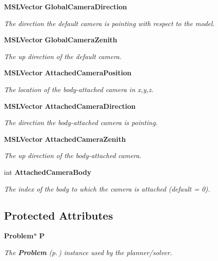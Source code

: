 \begin{CompactItemize}
{\bf MSLVector} {\bf Global\-Camera\-Direction}
\begin{CompactList}\small\item\em The direction the default camera is pointing with respect to the model.\item\end{CompactList}\item 
{\bf MSLVector} {\bf Global\-Camera\-Zenith}
\begin{CompactList}\small\item\em The up direction of the default camera.\item\end{CompactList}\item 
{\bf MSLVector} {\bf Attached\-Camera\-Position}
\begin{CompactList}\small\item\em The location of the body-attached camera in x,y,z.\item\end{CompactList}\item 
{\bf MSLVector} {\bf Attached\-Camera\-Direction}
\begin{CompactList}\small\item\em The direction the body-attached camera is pointing.\item\end{CompactList}\item 
{\bf MSLVector} {\bf Attached\-Camera\-Zenith}
\begin{CompactList}\small\item\em The up direction of the body-attached camera.\item\end{CompactList}\item 
int {\bf Attached\-Camera\-Body}
\begin{CompactList}\small\item\em The index of the body to which the camera is attached (default = 0).\item\end{CompactList}\end{CompactItemize}
\subsection*{Protected Attributes}
\begin{CompactItemize}
\item 
{\bf Problem}$\ast$ {\bf P}
\begin{CompactList}\small\item\em The {\bf Problem} {\rm (p.\,\pageref{class_Problem})} instance used by the planner/solver.\item\end{CompactList}\end{CompactItemize}


